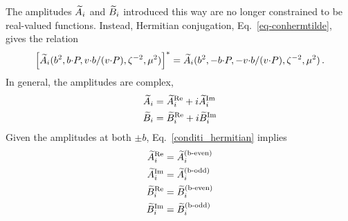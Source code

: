 \begin{widetext}
The amplitudes $\widetilde{A}_i$ and $\widetilde{B}_i$ introduced this way are no longer constrained to be real-valued functions. Instead, Hermitian conjugation, Eq.\ \eqref{eq-conhermtilde}, gives the relation
\begin{equation}
	\left[ \widetilde{A}_i(b^2,b {\cdot} P, v {\cdot} b / (v {\cdot} P), \zeta^{-2},\mu^2) \right]^* = \widetilde{A}_i(b^2,-b {\cdot} P, -v {\cdot} b / (v {\cdot} P), \zeta^{-2},\mu^2)\, .\label{conditi_hermitian}
\end{equation}
In general, the amplitudes are complex,
\begin{align}
    \widetilde{A}_i&=\widetilde{A}_i^{\text{Re}}+i\widetilde{A}_i^{\text{Im}}\\
    \widetilde{B}_i&=\widetilde{B}_i^{\text{Re}}+i\widetilde{B}_i^{\text{Im}}
\end{align}
Given the amplitudes at both $\pm b$, Eq.\ \eqref{conditi_hermitian} implies
\begin{subequations}
\label{eq-ReIm-parity}
\begin{align}
    \widetilde{A}_i^{\text{Re}}&=\widetilde{A}_i^{\text{(b-even)}}\\
    \widetilde{A}_i^{\text{Im}}&=\widetilde{A}_i^{\text{(b-odd)}}\\
    \widetilde{B}_i^{\text{Re}}&=\widetilde{B}_i^{\text{(b-even)}}\\
    \widetilde{B}_i^{\text{Im}}&=\widetilde{B}_i^{\text{(b-odd)}}
\end{align}
\end{subequations}

\end{widetext}

